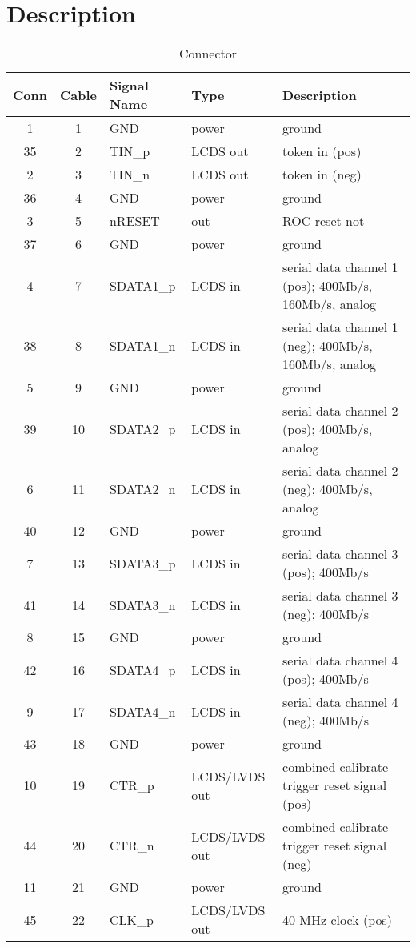 \section{Description}


\begin{table}[p]
\caption{Connector}
{\scriptsize
\begin{tabular}{cclll}
\toprule
\multicolumn{1}{l}{Conn} & \multicolumn{1}{l}{Cable} & Signal Name & Type & Description \\ 
\midrule
1 & 1 & GND & power & ground \\ 
35 & 2 & TIN\_p & LCDS out & token in (pos) \\ 
2 & 3 & TIN\_n & LCDS out & token in (neg) \\ 
36 & 4 & GND & power & ground \\ 
3 & 5 & nRESET & out & ROC reset not \\ 
37 & 6 & GND & power & ground \\ 
4 & 7 & SDATA1\_p & LCDS in & serial data channel 1 (pos); 400Mb/s, 160Mb/s, analog \\ 
38 & 8 & SDATA1\_n & LCDS in & serial data channel 1 (neg); 400Mb/s, 160Mb/s, analog \\ 
5 & 9 & GND & power & ground \\ 
39 & 10 & SDATA2\_p & LCDS in & serial data channel 2 (pos); 400Mb/s, analog \\ 
6 & 11 & SDATA2\_n & LCDS in & serial data channel 2 (neg); 400Mb/s, analog \\ 
40 & 12 & GND & power & ground \\ 
7 & 13 & SDATA3\_p & LCDS in & serial data channel 3 (pos); 400Mb/s \\ 
41 & 14 & SDATA3\_n & LCDS in & serial data channel 3 (neg); 400Mb/s \\ 
8 & 15 & GND & power & ground \\ 
42 & 16 & SDATA4\_p & LCDS in & serial data channel 4 (pos); 400Mb/s \\ 
9 & 17 & SDATA4\_n & LCDS in & serial data channel 4 (neg); 400Mb/s \\ 
43 & 18 & GND & power & ground \\ 
10 & 19 & CTR\_p & LCDS/LVDS out & combined calibrate trigger reset signal (pos) \\ 
44 & 20 & CTR\_n & LCDS/LVDS out & combined calibrate trigger reset signal (neg) \\ 
11 & 21 & GND & power & ground \\ 
45 & 22 & CLK\_p & LCDS/LVDS out & 40 MHz clock (pos) \\ 

\end{tabular}}
\end{table}
